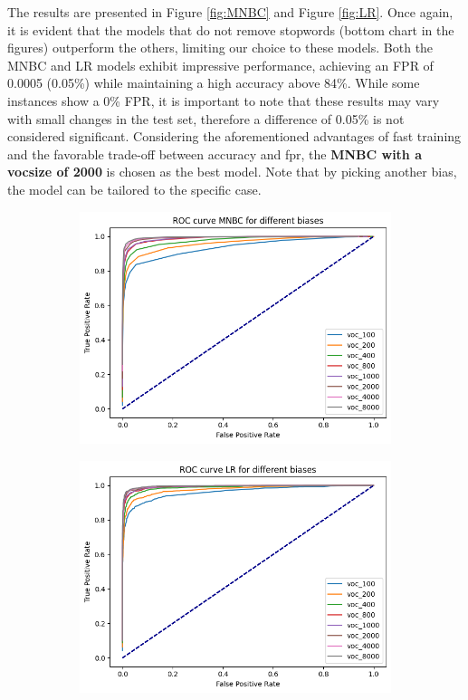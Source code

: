 \documentclass{article}
\begin{document}
\begin{multicols}{2}
\noindent
The results are presented in Figure \ref{fig:MNBC} and Figure \ref{fig:LR}. 
Once again, it is evident that the models that do not remove stopwords (bottom chart in the figures) outperform the others, limiting our choice to these models.
Both the MNBC and LR models exhibit impressive performance, 
achieving an FPR of 0.0005 (0.05\%) while maintaining a high accuracy above 84\%. 
While some instances show a 0\% FPR, it is important to note that these results may vary with small changes in the test set, therefore
a difference of 0.05\% is not considered significant.
Considering the aforementioned advantages of fast training and the favorable trade-off between accuracy and fpr, the \textbf{MNBC with a vocsize of 2000} 
is chosen as the best model. Note that by picking another bias\footnotemark, the model can be tailored to the specific case.


    \begin{figure}[H]
        \begin{subfigure}{\linewidth}
        \centering
        \includegraphics[width=0.87\columnwidth]{Figures/ROC_mnbc_nostop.png}
        \end{subfigure}
        
        \begin{subfigure}{\linewidth}
        \centering
        \includegraphics[width=0.87\columnwidth]{Figures/ROC_lr_nostop.png}
        \end{subfigure}
        

\end{figure}
\end{multicols}
\end{document}
